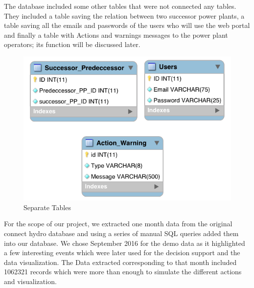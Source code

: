 The database included some other tables that were not connected any tables. They included a table saving the relation between two successor power plants, a table saving all the emails and passwords of the users who will use the web portal and finally a table with Actions and warnings messages to the power plant operators; its function will be discussed later.
\begin{figure}[H]
\centering
\includegraphics[scale=0.5]{Images/Othertables.png}
\caption[Separate Tables]{Separate Tables}
\end{figure}
For the scope of our project, we extracted one month data from the original connect hydro database and using a series of manual SQL queries added them into our database. We chose September 2016 for the demo data as it highlighted a few interesting events which were later used for the decision support and the data visualization. The Data extracted corresponding to that month included 1062321 records which were more than enough to simulate the different actions and visualization.
